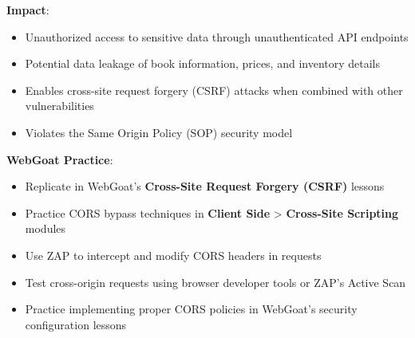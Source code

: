 \documentclass[]{UCD_CS_FYP_Report}
\begin{document}
\textbf{Impact}:
\begin{itemize}
    \item Unauthorized access to sensitive data through unauthenticated API endpoints
    \item Potential data leakage of book information, prices, and inventory details
    \item Enables cross-site request forgery (CSRF) attacks when combined with other vulnerabilities
    \item Violates the Same Origin Policy (SOP) security model
\end{itemize}

\textbf{WebGoat Practice}:
\begin{itemize}
    \item Replicate in WebGoat's \textbf{Cross-Site Request Forgery (CSRF)} lessons
    \item Practice CORS bypass techniques in \textbf{Client Side} > \textbf{Cross-Site Scripting} modules
    \item Use ZAP to intercept and modify CORS headers in requests
    \item Test cross-origin requests using browser developer tools or ZAP's Active Scan
    \item Practice implementing proper CORS policies in WebGoat's security configuration lessons
\end{itemize}
\end{document}
